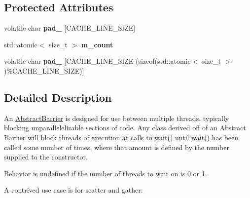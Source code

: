 \subsection*{Protected Attributes}
\begin{DoxyCompactItemize}
\item 
\hypertarget{class_d_x_1_1_lock_free_1_1_abstract_barrier_a17dd0c6e950114baf17495d62a00af5a}{volatile char {\bfseries pad\-\_} \mbox{[}C\-A\-C\-H\-E\-\_\-\-L\-I\-N\-E\-\_\-\-S\-I\-Z\-E\mbox{]}}\label{class_d_x_1_1_lock_free_1_1_abstract_barrier_a17dd0c6e950114baf17495d62a00af5a}

\item 
\hypertarget{class_d_x_1_1_lock_free_1_1_abstract_barrier_a348b132862ba722bc278d07cd2d714c3}{std\-::atomic$<$ size\-\_\-t $>$ {\bfseries m\-\_\-count}}\label{class_d_x_1_1_lock_free_1_1_abstract_barrier_a348b132862ba722bc278d07cd2d714c3}

\item 
\hypertarget{class_d_x_1_1_lock_free_1_1_abstract_barrier_a3127ea3626fcce39c5534ec5e485fe13}{volatile char {\bfseries pad\-\_} \mbox{[}C\-A\-C\-H\-E\-\_\-\-L\-I\-N\-E\-\_\-\-S\-I\-Z\-E-\/(sizeof(std\-::atomic$<$ size\-\_\-t $>$)\%C\-A\-C\-H\-E\-\_\-\-L\-I\-N\-E\-\_\-\-S\-I\-Z\-E)\mbox{]}}\label{class_d_x_1_1_lock_free_1_1_abstract_barrier_a3127ea3626fcce39c5534ec5e485fe13}

\end{DoxyCompactItemize}


\subsection{Detailed Description}
An \hyperlink{class_d_x_1_1_lock_free_1_1_abstract_barrier}{Abstract\-Barrier} is designed for use between multiple threads, typically blocking unparallelelizable sections of code. Any class derived off of an Abstract Barrier will block threads of execution at calls to \hyperlink{class_d_x_1_1_lock_free_1_1_abstract_barrier_a9040adf7507467e5a653bdaf2fbd17a6}{wait()} until \hyperlink{class_d_x_1_1_lock_free_1_1_abstract_barrier_a9040adf7507467e5a653bdaf2fbd17a6}{wait()} has been called some number of times, where that amount is defined by the number supplied to the constructor. 

Behavior is undefined if the number of threads to wait on is 0 or 1.

A contrived use case is for scatter and gather\-:



